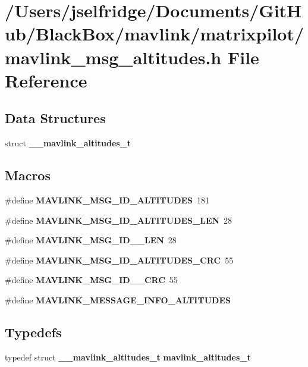 \section{/\+Users/jselfridge/\+Documents/\+Git\+Hub/\+Black\+Box/mavlink/matrixpilot/mavlink\+\_\+msg\+\_\+altitudes.h File Reference}
\label{mavlink__msg__altitudes_8h}
\subsection*{Data Structures}
\begin{DoxyCompactItemize}
\item 
struct \textbf{ \+\_\+\+\_\+mavlink\+\_\+altitudes\+\_\+t}
\end{DoxyCompactItemize}
\subsection*{Macros}
\begin{DoxyCompactItemize}
\item 
\#define \textbf{ M\+A\+V\+L\+I\+N\+K\+\_\+\+M\+S\+G\+\_\+\+I\+D\+\_\+\+A\+L\+T\+I\+T\+U\+D\+ES}~181
\item 
\#define \textbf{ M\+A\+V\+L\+I\+N\+K\+\_\+\+M\+S\+G\+\_\+\+I\+D\+\_\+\+A\+L\+T\+I\+T\+U\+D\+E\+S\+\_\+\+L\+EN}~28
\item 
\#define \textbf{ M\+A\+V\+L\+I\+N\+K\+\_\+\+M\+S\+G\+\_\+\+I\+D\+\_\+\_\+\+L\+EN}~28
\item 
\#define \textbf{ M\+A\+V\+L\+I\+N\+K\+\_\+\+M\+S\+G\+\_\+\+I\+D\+\_\+\+A\+L\+T\+I\+T\+U\+D\+E\+S\+\_\+\+C\+RC}~55
\item 
\#define \textbf{ M\+A\+V\+L\+I\+N\+K\+\_\+\+M\+S\+G\+\_\+\+I\+D\+\_\+\_\+\+C\+RC}~55
\item 
\#define \textbf{ M\+A\+V\+L\+I\+N\+K\+\_\+\+M\+E\+S\+S\+A\+G\+E\+\_\+\+I\+N\+F\+O\+\_\+\+A\+L\+T\+I\+T\+U\+D\+ES}
\end{DoxyCompactItemize}
\subsection*{Typedefs}
\begin{DoxyCompactItemize}
\item 
typedef struct \textbf{ \+\_\+\+\_\+mavlink\+\_\+altitudes\+\_\+t} \textbf{ mavlink\+\_\+altitudes\+\_\+t}
\end{DoxyCompactItemize}



